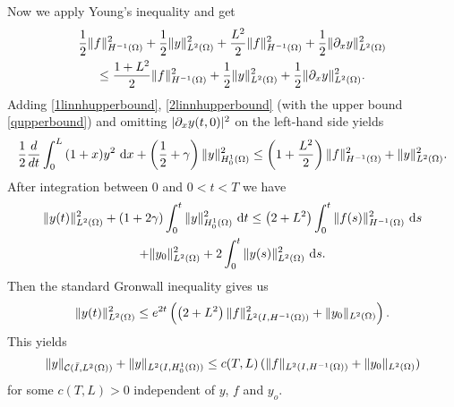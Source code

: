 Now we apply Young's inequality and get
\begin{multline}\label{qupperbound}
\frac{1}{2}\norm{f}_{H^{-1}(\Omega)}^{2} + \frac{1}{2}\norm{y}_{L^{2}(\Omega)}^{2} + \frac{L^{2}}{2}\norm{f}_{H^{-1}(\Omega)}^{2} + \frac{1}{2}\norm{\partial_{x}y}_{L^{2}(\Omega)}^{2}\\
\leq \frac{1+L^{2}}{2}\norm{f}_{H^{-1}(\Omega)}^{2}+\frac{1}{2}\norm{y}_{L^{2}(\Omega)}^{2}+\frac{1}{2}\norm{\partial_{x}y}_{L^{2}(\Omega)}^{2}.
\end{multline}
Adding \eqref{1linnhupperbound}, \eqref{2linnhupperbound} (with the upper bound \eqref{qupperbound}) and omitting $\lvert\partial_{x} y(t,0)\rvert^{2}$ on the left-hand side yields
\[
\frac{1}{2}\frac{d}{dt}\int_{0}^{L}{(1+x)y^{2}~\mathrm dx} +\left(\frac{1}{2}+\gamma\right)\|y\|_{H^1_0(\Omega)}^2\leq \left(1 +\frac{L^{2}}{2}\right)\lVert f\rVert_{H^{-1}(\Omega)}^{2} + \|y\|_{L^2(\Omega)}^2.
\]
After integration between $0$ and $0<t<T$ we have
\begin{multline}\label{primitive}
\|y(t)\|_{L^2(\Omega)}^2+ \left( 1+2\gamma \right)\int_{0}^{t}{\|y\|_{H^1_0(\Omega)}^2~\mathrm dt}\leq \left(2+L^{2}\right)\int_{0}^{t}{\norm{f(s)}_{H^{-1}(\Omega)}^{2}~\mathrm ds}\\
+\|y_{0}\|_{L^2(\Omega)}^2+2\int_0^t{\|y(s)\|_{L^2(\Omega)}^2~\mathrm ds}.
\end{multline}
Then the standard Gronwall inequality gives us
\[
\|y(t)\|_{L^2(\Omega)}^2  \leq e^{2t}\left(\left(2+L^{2}\right)\lVert f\rVert_{L^{2}(I,H^{-1}(\Omega))}^{2}+\lVert y_{0}\rVert_{L^{2}(\Omega)}\right).
\]
This yields
\[
\|y\|_{\mathcal C(\bar I,L^2(\Omega))}+\|y\|_{L^2(I,H^1_0(\Omega))}\leq c(T,L)\,(\|f\|_{\Hm1}+\|y_0\|_{L^2(\Omega)})
\]
for some $c(T,L)>0$ independent of $y$, $f$ and $y_o$.
